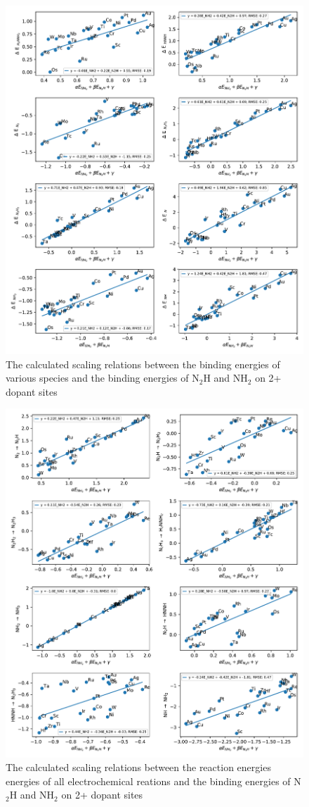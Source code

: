 \documentclass{article}
\begin{document}
\begin{figure}
\centering
\includegraphics[width=0.8\linewidth]{Images/scaling_species.pdf}
\caption{The calculated scaling relations between the binding energies of various species and the binding energies of N$_2$H and NH$_2$ on 2+ dopant sites}
\label{fig:scaling_species}
\end{figure}

\begin{figure}
\centering
\includegraphics[width=0.8\linewidth]{Images/scaling_reactions.pdf}
\caption{The calculated scaling relations between the reaction energies energies of all electrochemical reations and the binding energies of N$_2$H and NH$_2$ on 2+ dopant sites}
\label{fig:scaling_reactions}
\end{figure}
\end{document}
